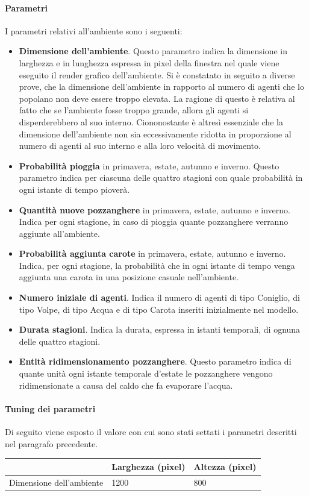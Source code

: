 \documentclass[11pt]{article}
\begin{document}
\paragraph{Parametri}
I parametri relativi all'ambiente sono i seguenti: 
\begin{itemize}
    \item \textbf{Dimensione dell'ambiente}. Questo parametro indica la dimensione in larghezza e in lunghezza espressa in pixel della finestra nel quale viene eseguito il render grafico dell'ambiente. Si è constatato in seguito a diverse prove, che la dimensione dell'ambiente in rapporto al numero di agenti che lo popolano non deve essere troppo elevata. La ragione di questo è relativa al fatto che se l'ambiente fosse troppo grande, allora gli agenti si disperderebbero al suo interno. Ciononostante è altresì essenziale che la dimensione dell'ambiente non sia eccessivamente ridotta in proporzione al numero di agenti al suo interno e alla loro velocità di movimento. 
    \item \textbf{Probabilità pioggia} in primavera, estate, autunno e inverno. Questo parametro indica per ciascuna delle quattro stagioni con quale probabilità in ogni istante di tempo pioverà.
    \item \textbf{Quantità nuove pozzanghere} in primavera, estate, autunno e inverno. Indica per ogni stagione, in caso di pioggia quante pozzanghere verranno aggiunte all'ambiente. 
    \item \textbf{Probabilità aggiunta carote} in primavera, estate, autunno e inverno. Indica, per ogni stagione, la probabilità che in ogni istante di tempo venga aggiunta una carota in una posizione casuale nell'ambiente. 
    \item \textbf{Numero iniziale di agenti}. Indica il numero di agenti di tipo Coniglio, di tipo Volpe, di tipo Acqua e di tipo Carota inseriti inizialmente nel modello. 
    \item \textbf{Durata stagioni}. Indica la durata, espressa in istanti temporali, di ognuna delle quattro stagioni. 
    \item \textbf{Entità ridimensionamento pozzanghere}. Questo parametro indica di quante unità ogni istante temporale d'estate le pozzanghere vengono ridimensionate a causa del caldo che fa evaporare l'acqua. 
\end{itemize}
\vspace{2pt}
\paragraph{Tuning dei parametri}
\label{sec:tuningAmbiente}
Di seguito viene esposto il valore con cui sono stati settati i parametri descritti nel paragrafo precedente.
\begin{table}[h!]
\centering
\begin{tabular}{@{}lll@{}}
\toprule
                         & Larghezza (pixel) & Altezza (pixel) \\ \midrule
Dimensione dell'ambiente & 1200      & 800      
\end{tabular}
\end{table}
\end{document}
